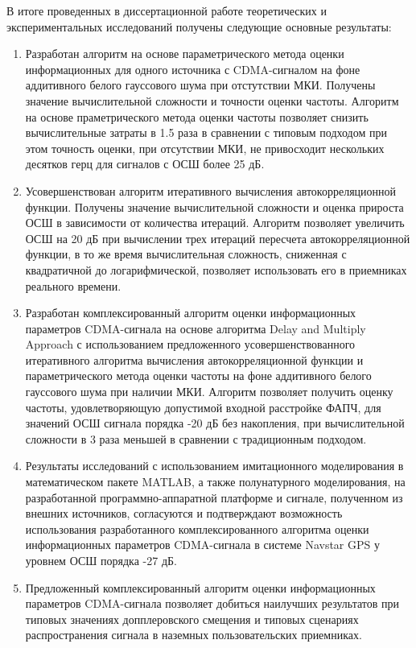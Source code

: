 В итоге проведенных в диссертационной работе теоретических и экспериментальных исследований получены следующие основные результаты:
\begin{enumerate}
	\item Разработан алгоритм на основе параметрического метода оценки информационных для одного источника с CDMA-сигналом на фоне аддитивного белого гауссового шума при отстутствии МКИ.
		Получены значение вычислительной сложности и точности оценки частоты. Алгоритм на основе праметрического метода оценки частоты позволяет снизить вычислительные
		затраты в 1.5 раза в сравнении с типовым подходом при этом точность оценки, при отсутствии МКИ, не привосходит нескольких десятков герц для сигналов
		с ОСШ более 25 дБ.
	\item Усовершенствован алгоритм итеративного вычисления автокорреляционной функции. Получены значение вычислительной сложности и оценка
		прироста ОСШ в зависимости от количества итераций. Алгоритм позволяет увеличить ОСШ на 20 дБ при вычислении трех итераций
		пересчета автокорреляционной функции, в то же время вычислительная сложность, сниженная с квадратичной до логарифмической,
		позволяет использовать его в приемниках реального времени.
	\item Разработан комплексированный алгоритм оценки информационных параметров CDMA-сигнала на основе алгоритма Delay and Multiply Approach с использованием
		предложенного усовершенствованного итеративного алгоритма вычисления автокорреляционной функции и параметрического
		метода оценки частоты на фоне аддитивного белого гауссового шума при наличии МКИ. Алгоритм позволяет получить оценку частоты, удовлетворяющую
		допустимой входной расстройке ФАПЧ, для значений ОСШ сигнала порядка -20 дБ без накопления, при вычислительной сложности в 3 раза меньшей в сравнении с традиционным подходом.
	\item Результаты исследований с использованием имитационного моделирования в математическом пакете MATLAB, а также полунатурного моделирования,
		на разработанной программно-аппаратной платформе и сигнале, полученном из внешних источников, согласуются и подтверждают возможность
		использования разработанного комплексированного алгоритма оценки информационных параметров CDMA-сигнала в системе Navstar GPS у уровнем ОСШ порядка -27 дБ.
	\item Предложенный комплексированный алгоритм оценки информационных параметров CDMA-сигнала позволяет добиться наилучших результатов при
		типовых значениях допплеровского смещения и типовых сценариях распространения сигнала в наземных пользовательских приемниках.
\end{enumerate}


\clearpage
